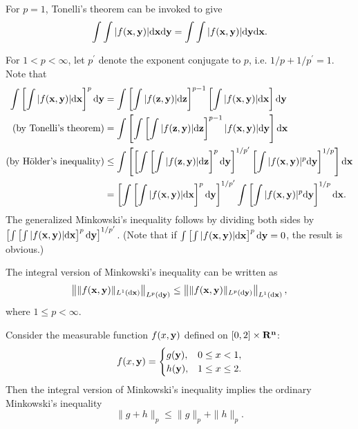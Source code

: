 \begin{exercise}{8.8}\label{88}
  For $p=1$, Tonelli's theorem can be invoked to give 
  $$\int\int|f(\mathbf{x},\mathbf{y})|\mathrm{d}\mathbf{x}\mathrm{d}\mathbf{y}=\int\int|f(\mathbf{x},\mathbf{y})|\mathrm{d}\mathbf{y}\mathrm{d}\mathbf{x}.$$
  
  For $1<p<\infty$, let $p^\prime$ denote the exponent conjugate to $p$, i.e. $1/p+1/p^\prime=1$. Note that
  \begin{equation*}
      \begin{aligned}
        \int\left[\int|f(\mathbf{x},\mathbf{y})|\mathrm{d}\mathbf{x}\right]^p\mathrm{d}\mathbf{y}&=\int\left[\int|f(\mathbf{z},\mathbf{y})|\mathrm{d}\mathbf{z}\right]^{p-1}\left[\int|f(\mathbf{x},\mathbf{y})|\mathrm{d}\mathbf{x}\right]\mathrm{d}\mathbf{y}\\
        (\text{by Tonelli's theorem})&=\int\left[\int\left[\int|f(\mathbf{z},\mathbf{y})|\mathrm{d}\mathbf{z}\right]^{p-1}|f(\mathbf{x},\mathbf{y})|\mathrm{d}\mathbf{y}\right]\mathrm{d}\mathbf{x}\\
        (\text{by H\"older's inequality})&\leq\int\left[\left[\int\left[\int|f(\mathbf{z},\mathbf{y})|\mathrm{d}\mathbf{z}\right]^p\mathrm{d}\mathbf{y}\right]^{1/p^\prime}\left[\int|f(\mathbf{x},\mathbf{y})|^p\mathrm{d}\mathbf{y}\right]^{1/p}\right]\mathrm{d}\mathbf{x}\\
       &=\left[\int\left[\int|f(\mathbf{x},\mathbf{y})|\mathrm{d}\mathbf{x}\right]^{p}\mathrm{d}\mathbf{y}\right]^{1/p^\prime}\int\left[\int|f(\mathbf{x},\mathbf{y})|^p\mathrm{d}\mathbf{y}\right]^{1/p}\mathrm{d} \mathbf{x}.
      \end{aligned}
  \end{equation*}
  The generalized Minkowski's inequality follows by dividing both sides by $\left[\int\left[\int|f(\mathbf{x},\mathbf{y})|\mathrm{d}\mathbf{x}\right]^{p}\mathrm{d}\mathbf{y}\right]^{1/p^\prime}$. (Note that if $\int\left[\int|f(\mathbf{x},\mathbf{y})|\mathrm{d}\mathbf{x}\right]^p\mathrm{d}\mathbf{y}=0$, the result is obvious.)
\end{exercise}
\begin{remark}
The integral version of Minkowski's inequality can be written as
$$\left\Vert\|f(\mathbf{x},\mathbf{y})\|_{L^1(\mathrm{d}\mathbf{x})}\right\Vert_{L^p(\mathrm{d}\mathbf{y})}\leq\left\Vert\|f(\mathbf{x},\mathbf{y})\|_{L^p(\mathrm{d}\mathbf{y})}\right\Vert_{L^1(\mathrm{d}\mathbf{x})},$$
where $1\leq p<\infty$. 

Consider the measurable function $f(x,\mathbf{y})$ defined on $[0,2]\times\mathbf{R^n}$:
$$
f(x,\mathbf{y})= \begin{cases}g(\mathbf{y}), & 0\leq x<1, \\ h(\mathbf{y}), & 1\leq x\leq2.\end{cases}
$$
Then the integral version of Minkowski's inequality implies the ordinary Minkowski's inequality $$\|g+h\|_p\leq\|g\|_p+\|h\|_p.$$
\end{remark}
